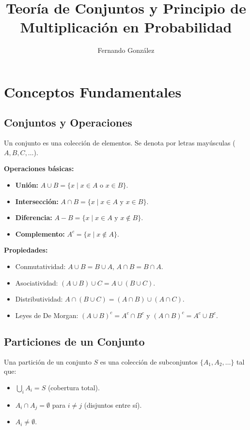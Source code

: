 \documentclass{article}
\begin{document}
	
	\title{Teoría de Conjuntos y Principio de Multiplicación en Probabilidad}
	\author{Fernando González}
	\date{}
	\maketitle
	
	\section{Conceptos Fundamentales}
	
	\subsection{Conjuntos y Operaciones}
	Un conjunto es una colección de elementos. Se denota por letras mayúsculas ($A, B, C, \dots$). 
	
	\textbf{Operaciones básicas:}
	\begin{itemize}
		\item \textbf{Unión:} $A \cup B = \{ x \mid x \in A \text{ o } x \in B \}$.
		\item \textbf{Intersección:} $A \cap B = \{ x \mid x \in A \text{ y } x \in B \}$.
		\item \textbf{Diferencia:} $A - B = \{ x \mid x \in A \text{ y } x \notin B \}$.
		\item \textbf{Complemento:} $A^c = \{ x \mid x \notin A \}$.
	\end{itemize}
	
	\textbf{Propiedades:}
	\begin{itemize}
		\item Conmutatividad: $A \cup B = B \cup A$, $A \cap B = B \cap A$.
		\item Asociatividad: $(A \cup B) \cup C = A \cup (B \cup C)$.
		\item Distributividad: $A \cap (B \cup C) = (A \cap B) \cup (A \cap C)$.
		\item Leyes de De Morgan: $(A \cup B)^c = A^c \cap B^c$ y $(A \cap B)^c = A^c \cup B^c$.
	\end{itemize}
	
	\subsection{Particiones de un Conjunto}
	Una partición de un conjunto $S$ es una colección de subconjuntos $\{ A_1, A_2, \dots \}$ tal que:
	\begin{itemize}
		\item $\bigcup_{i} A_i = S$ (cobertura total).
		\item $A_i \cap A_j = \emptyset$ para $i \neq j$ (disjuntos entre sí).
		\item $A_i \neq \emptyset$.
	\end{itemize}
	
\end{document}
